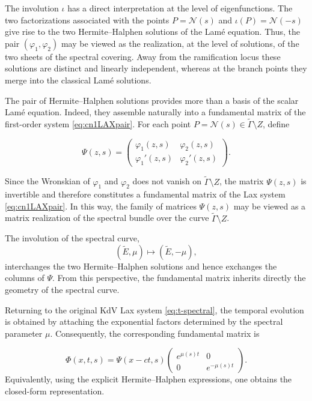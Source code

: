 \documentclass[a4paper,12pt]{article}
\begin{document}
The involution \(\iota\) has a direct interpretation at the level of
eigenfunctions. The two factorizations associated with the points
\(P=\mathcal N(s)\) and \(\iota(P)=\mathcal N(-s)\) give rise to the two
Hermite–Halphen solutions of the Lamé equation. Thus, the pair
\((\varphi_1,\varphi_2)\) may be viewed as the realization, at the level of
solutions, of the two sheets of the spectral covering. Away from the
ramification locus these solutions are distinct and linearly
independent, whereas at the branch points they merge into the classical
Lam\'e solutions.



The pair of Hermite–Halphen solutions provides more than a basis of the
scalar Lamé equation. Indeed, they assemble naturally into a fundamental
matrix of the first-order system \eqref{eq:cn1LAXpair}. For each point
\(P=\mathcal N(s)\in\widetilde\Gamma\setminus Z\), define

\[
\Psi(z,s)
=
\begin{pmatrix}
\varphi_1(z,s) & \varphi_2(z,s)\\
\varphi_1'(z,s) & \varphi_2'(z,s)
\end{pmatrix}.
\tag{34}
\]

Since the Wronskian of \(\varphi_1\) and \(\varphi_2\) does not vanish on
\(\widetilde\Gamma\setminus Z\), the matrix \(\Psi(z,s)\) is invertible
and therefore constitutes a fundamental matrix of the Lax system \eqref{eq:cn1LAXpair}.
In this way, the family of matrices \(\Psi(z,s)\) may be viewed as a
matrix realization of the spectral bundle over the curve
\(\widetilde\Gamma \setminus Z\).

The involution of the spectral curve,
\[
(\widetilde E,\mu)\longmapsto (\widetilde E,-\mu),
\]
interchanges the two Hermite–Halphen solutions and hence exchanges the
columns of \(\Psi\). From this perspective, the fundamental matrix
inherits directly the geometry of the spectral curve.


Returning to the original KdV Lax system \eqref{eq:t-spectral}, the temporal evolution is
obtained by attaching the exponential factors determined by the spectral
parameter \(\mu\). Consequently, the corresponding fundamental matrix is

\[
\Phi(x,t,s)
=
\Psi(x-ct,s)
\begin{pmatrix}
e^{\mu(s)t} & 0\\
0 & e^{-\mu(s)t}
\end{pmatrix}.
\tag{35}
\]
Equivalently, using the explicit Hermite–Halphen expressions, one
obtains the closed-form representation.
\end{document}

